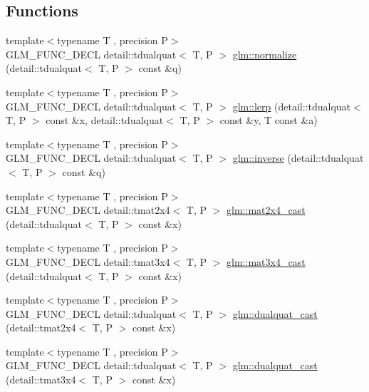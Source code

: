 \subsection*{Functions}
\begin{DoxyCompactItemize}
\item 
{\footnotesize template$<$typename T , precision P$>$ }\\G\+L\+M\+\_\+\+F\+U\+N\+C\+\_\+\+D\+E\+CL detail\+::tdualquat$<$ T, P $>$ \hyperlink{group__gtc__dual__quaternion_ga4364d115fe8ee2f65ff047726133d0ad}{glm\+::normalize} (detail\+::tdualquat$<$ T, P $>$ const \&q)
\item 
{\footnotesize template$<$typename T , precision P$>$ }\\G\+L\+M\+\_\+\+F\+U\+N\+C\+\_\+\+D\+E\+CL detail\+::tdualquat$<$ T, P $>$ \hyperlink{group__gtc__dual__quaternion_ga28cbcf029272d5351d4695b8610de126}{glm\+::lerp} (detail\+::tdualquat$<$ T, P $>$ const \&x, detail\+::tdualquat$<$ T, P $>$ const \&y, T const \&a)
\item 
{\footnotesize template$<$typename T , precision P$>$ }\\G\+L\+M\+\_\+\+F\+U\+N\+C\+\_\+\+D\+E\+CL detail\+::tdualquat$<$ T, P $>$ \hyperlink{group__gtc__dual__quaternion_gaad6b9faeb1134c04defae01426a777f8}{glm\+::inverse} (detail\+::tdualquat$<$ T, P $>$ const \&q)
\item 
{\footnotesize template$<$typename T , precision P$>$ }\\G\+L\+M\+\_\+\+F\+U\+N\+C\+\_\+\+D\+E\+CL detail\+::tmat2x4$<$ T, P $>$ \hyperlink{group__gtc__dual__quaternion_gade155fb0dfc144259a25897776e73325}{glm\+::mat2x4\+\_\+cast} (detail\+::tdualquat$<$ T, P $>$ const \&x)
\item 
{\footnotesize template$<$typename T , precision P$>$ }\\G\+L\+M\+\_\+\+F\+U\+N\+C\+\_\+\+D\+E\+CL detail\+::tmat3x4$<$ T, P $>$ \hyperlink{group__gtc__dual__quaternion_ga2f4f0a1275fa95c272dd6ad6df75013d}{glm\+::mat3x4\+\_\+cast} (detail\+::tdualquat$<$ T, P $>$ const \&x)
\item 
{\footnotesize template$<$typename T , precision P$>$ }\\G\+L\+M\+\_\+\+F\+U\+N\+C\+\_\+\+D\+E\+CL detail\+::tdualquat$<$ T, P $>$ \hyperlink{group__gtc__dual__quaternion_gad47c752ec23a5f9924e7d7f84c40f3e5}{glm\+::dualquat\+\_\+cast} (detail\+::tmat2x4$<$ T, P $>$ const \&x)
\item 
{\footnotesize template$<$typename T , precision P$>$ }\\G\+L\+M\+\_\+\+F\+U\+N\+C\+\_\+\+D\+E\+CL detail\+::tdualquat$<$ T, P $>$ \hyperlink{group__gtc__dual__quaternion_ga97c4fb8941ad1954e01578cca8182180}{glm\+::dualquat\+\_\+cast} (detail\+::tmat3x4$<$ T, P $>$ const \&x)
\end{DoxyCompactItemize}


